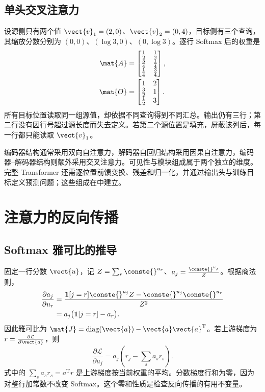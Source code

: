 \documentclass[../textbook.tex]{subfiles}
\begin{document}
\subsection{单头交叉注意力}
设源侧只有两个值 $\vect{v}_1=(2,0)$、$\vect{v}_2=(0,4)$，目标侧有三个查询，其缩放分数分别为 $(0,0)$、$(\log3,0)$、$(0,\log3)$。逐行 Softmax 后的权重是
\begin{equation}
 \begin{aligned}
  \mat{A}&=\begin{bmatrix}\frac{1}{2}&\frac{1}{2}\\\frac{3}{4}&\frac{1}{4}\\\frac{1}{4}&\frac{3}{4}\end{bmatrix},\\
  \mat{O}&=\begin{bmatrix}1&2\\\frac{3}{2}&1\\\frac{1}{2}&3\end{bmatrix}.
 \end{aligned}
\end{equation}
所有目标位置读取同一组源值，却依据不同查询得到不同汇总。输出仍有三行；第二行没有因行号超过源长度而失去定义。若第二个源位置是填充，屏蔽该列后，每一行都只能读取 $\vect{v}_1$。

编码器结构通常采用双向自注意力，解码器自回归结构采用因果自注意力，编码器--解码器结构则额外采用交叉注意力。可见性与模块组成属于两个独立的维度。完整 Transformer 还需逐位置前馈变换、残差和归一化，并通过输出头与训练目标定义预测问题；这些组成在中建立。

\section{注意力的反向传播}

\subsection{Softmax 雅可比的推导}
固定一行分数 $\vect{u}$，记 $Z=\sum_r \conste{}^{u_r}$、$a_j=\frac{\conste{}^{u_j}}{Z}$。根据商法则，
\begin{align}
 \frac{\partial a_j}{\partial u_r}
 &=\frac{\mathbf1[j=r]\conste{}^{u_j}Z-\conste{}^{u_j}\conste{}^{u_r}}{Z^2}\notag\\
 &=a_j\bigl(\mathbf1[j=r]-a_r\bigr).
\end{align}
因此雅可比为 $\mat{J}=\operatorname{diag}(\vect{a})-\vect{a}\vect{a}^{\mathrm{T}}$。若上游梯度为 $r=\frac{\partial\mathcal L}{\partial \vect{a}}$，则
\begin{equation}
 \frac{\partial\mathcal L}{\partial u_j}
 =a_j\left(r_j-\sum_s a_sr_s\right).\label{eq:attn-softmax-backward}
\end{equation}
式中的 $\sum_s a_sr_s=a^{\mathrm{T}}r$ 是上游梯度按当前权重的平均。分数梯度行和为零，因为对整行加常数不改变 Softmax。这个零和性质是检查反向传播的有用不变量。
\end{document}
